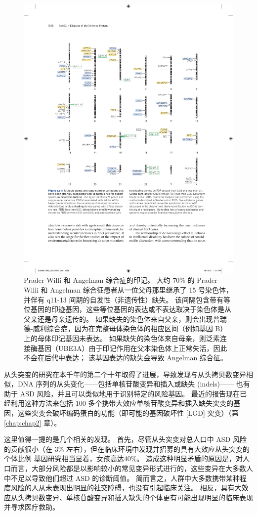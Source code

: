\begin{figure}[htbp]
	\centering
	\includegraphics[width=0.9\linewidth]{chap62/fig_62_8}
	\caption{Prader-Willi 和 Angelman 综合症的印记。 大约 70\% 的 Prader-Willi 和 Angelman 综合征患者从一位父母那里继承了 15 号染色体，并伴有 q11-13 间期的自发性（非遗传性）缺失。 该间隔包含带有等位基因的印迹基因，这些等位基因的表达或不表达取决于染色体是从父亲还是母亲遗传的。 如果缺失的染色体来自父亲，则会出现普瑞德-威利综合症，因为在完整母体染色体的相应区间（例如基因 B）上的母体印记基因未表达。 如果缺失的染色体来自母亲，则泛素连接酶基因（UBE3A）由于印记作用在父本染色体上正常失活，因此不会在后代中表达； 该基因表达的缺失会导致 Angelman 综合征。}
	\label{fig:62_8}
\end{figure}

从头突变的研究在本千年的第二个十年取得了进展，导致发现与从头拷贝数变异相似，DNA 序列的从头变化——包括单核苷酸变异和插入或缺失 (indels)—— 也有助于 ASD 风险，并且可以类似地用于识别特定的风险基因。 最近的报告现在已经利用这种方法来包括 100 多个携带大效应单核苷酸变异和插入缺失突变的基因，这些突变会破坏编码蛋白的功能（即可能的基因破坏性 [LGD] 突变）（第 \ref{chap:chap2} 章）。

这里值得一提的是几个相关的发现。 首先，尽管从头突变对总人口中 ASD 风险的贡献很小（在 3\% 左右），但在临床环境中发现并招募的具有大效应从头突变的个体比例 基因研究相当显着，女孩高达40\%。 造成这种明显矛盾的原因是，对人口而言，大部分风险都是以影响较小的常见变异形式进行的，这些变异在大多数人中不足以导致他们超过 ASD 的诊断阈值。 简而言之，人群中大多数携带某种程度风险的人从未表现出明显的社交障碍，也没有引起临床关注。 相反，具有大效应从头拷贝数变异、单核苷酸变异和插入缺失的个体更有可能出现明显的临床表现并寻求医疗救助。

